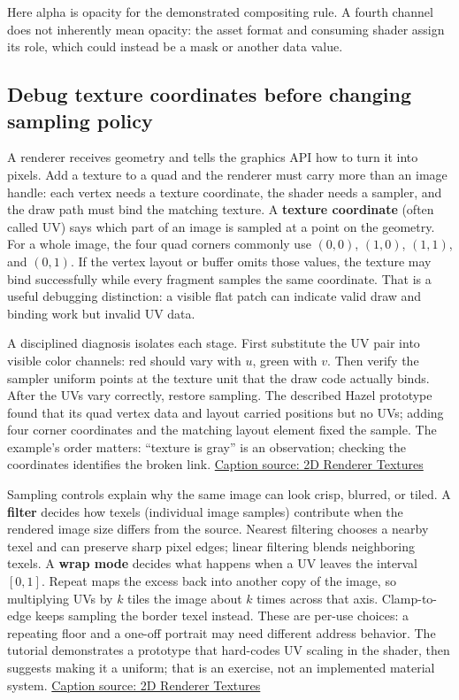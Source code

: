 Here alpha is opacity for the demonstrated compositing rule. A fourth channel does not inherently mean opacity: the asset format and consuming shader assign its role, which could instead be a mask or another data value.

\subsection{Debug texture coordinates before changing sampling policy}\label{06-engine-ii-ch027-debug-texture-coordinates-before-changing-sampling-policy}

\hypertarget{06-engine-ii-ch027-debug-texture-coordinates-before-changing-sampling-policy}{}

A renderer receives geometry and tells the graphics API how to turn it into pixels. Add a texture to a quad and the renderer must carry more than an image handle: each vertex needs a texture coordinate, the shader needs a sampler, and the draw path must bind the matching texture. A \textbf{texture coordinate} (often called UV) says which part of an image is sampled at a point on the geometry. For a whole image, the four quad corners commonly use \((0,0)\), \((1,0)\), \((1,1)\), and \((0,1)\). If the vertex layout or buffer omits those values, the texture may bind successfully while every fragment samples the same coordinate. That is a useful debugging distinction: a visible flat patch can indicate valid draw and binding work but invalid UV data.

A disciplined diagnosis isolates each stage. First substitute the UV pair into visible color channels: red should vary with \(u\), green with \(v\). Then verify the sampler uniform points at the texture unit that the draw code actually binds. After the UVs vary correctly, restore sampling. The described Hazel prototype found that its quad vertex data and layout carried positions but no UVs; adding four corner coordinates and the matching layout element fixed the sample. The example's order matters: ``texture is gray'' is an observation; checking the coordinates identifies the broken link. \href{https://www.youtube.com/watch?v=mW8eW3pLtmk}{Caption source: 2D Renderer Textures}

Sampling controls explain why the same image can look crisp, blurred, or tiled. A \textbf{filter} decides how texels (individual image samples) contribute when the rendered image size differs from the source. Nearest filtering chooses a nearby texel and can preserve sharp pixel edges; linear filtering blends neighboring texels. A \textbf{wrap mode} decides what happens when a UV leaves the interval \([0,1]\). Repeat maps the excess back into another copy of the image, so multiplying UVs by \(k\) tiles the image about \(k\) times across that axis. Clamp-to-edge keeps sampling the border texel instead. These are per-use choices: a repeating floor and a one-off portrait may need different address behavior. The tutorial demonstrates a prototype that hard-codes UV scaling in the shader, then suggests making it a uniform; that is an exercise, not an implemented material system. \href{https://www.youtube.com/watch?v=mW8eW3pLtmk}{Caption source: 2D Renderer Textures}


